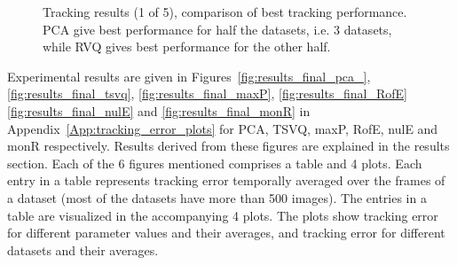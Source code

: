 \begin{Body}
								\begin{figure}[t]
								\centering
								
								\caption{Tracking results (1 of 5), comparison of best tracking performance.  PCA give best performance for half the datasets, i.e. 3 datasets, while RVQ gives best performance for the other half.}
								\label{fig:results_final_1_best}
								\end{figure}

Experimental results are given in Figures~\ref{fig:results_final_pca_}, \ref{fig:results_final_tsvq}, \ref{fig:results_final_maxP}, \ref{fig:results_final_RofE} \ref{fig:results_final_nulE} and \ref{fig:results_final_monR} in Appendix~\ref{App:tracking_error_plots} for PCA, TSVQ, maxP, RofE, nulE and monR respectively.  Results derived from these figures are explained in the results section.  Each of the 6 figures mentioned comprises a table and 4 plots.  Each entry in a table represents tracking error temporally averaged over the frames of a dataset (most of the datasets have more than 500 images).  The entries in a table are visualized in the accompanying 4 plots.  The plots show tracking error for different parameter values and their averages, and tracking error for different datasets and their averages.  


\end{Body}
